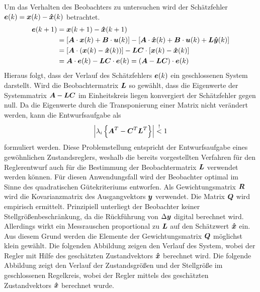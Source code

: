 Um das Verhalten des Beobachters zu untersuchen wird der Schätzfehler $\boldsymbol{e}(k) = \boldsymbol{x}(k) - \boldsymbol{\hat{x}}(k)$ betrachtet.
\begin{equation}
\begin{split}
\boldsymbol{e}(k+1) &= \boldsymbol{x}(k+1) - \boldsymbol{\hat{x}}(k+1) \\
&= [\boldsymbol{A}\cdot \boldsymbol{x}(k) + \boldsymbol{B}\cdot \boldsymbol{u}(k)] - [\boldsymbol{A}\cdot \boldsymbol{\hat{x}}(k) + \boldsymbol{B}\cdot \boldsymbol{u}(k) +\boldsymbol{L}\boldsymbol{\hat{y}}(k)]
\\
&= [\boldsymbol{A}\cdot (\boldsymbol{x}(k) - \boldsymbol{\hat{x}}(k))] - \boldsymbol{L}\boldsymbol{C}\cdot[\boldsymbol{x}(k)-\boldsymbol{\hat{x}}(k)] 
\\
&= \boldsymbol{A}\cdot \boldsymbol{e}(k) - \boldsymbol{LC}\cdot\boldsymbol{e}(k) = (\boldsymbol{A}-\boldsymbol{LC})\cdot \boldsymbol{e}(k)
\end{split}
\end{equation}
Hieraus folgt, dass der Verlauf des Schätzfehlers $\boldsymbol{e}(k)$ ein geschlossenen System darstellt. Wird die Beobachtermatrix $\boldsymbol{L}$ so gewählt, dass die Eigenwerte der Systemmatrix $\boldsymbol{A}-\boldsymbol{LC}$ im Einheitskreis liegen konvergiert der Schätzfehler gegen null. Da die Eigenwerte durch die Transponierung einer Matrix nicht verändert werden, kann die Entwurfsaufgabe als
\begin{equation}
\left\vert \lambda_i\left\{\boldsymbol{A}^T-\boldsymbol{C}^T\boldsymbol{L}^T\right\}\right\vert \overset{!}< 1
\end{equation}
formuliert werden. Diese Problemstellung entspricht der Entwurfsaufgabe eines gewöhnlichen Zustandsreglers, weshalb die bereits vorgestellten Verfahren für den Reglerentwurf auch für die Bestimmung der Beobachtermatrix $\boldsymbol{L}$ verwendet werden können. Für diesen Anwendungsfall wird der Beobachter optimal im Sinne des quadratischen Gütekriteriums entworfen. Als Gewichtungsmatrix $\boldsymbol{R}$ wird die Kovarianzmatrix des Ausgangvektors $\boldsymbol{y}$ verwendet. Die Matrix $\boldsymbol{Q}$ wird empirisch ermittelt. Prinzipiell unterliegt der Beobachter keiner Stellgrößenbeschränkung, da die Rückführung von $\Delta\boldsymbol{y}$ digital berechnet wird. Allerdings wirkt ein Messrauschen proportional zu $\boldsymbol{L}$ auf den Schätzwert $\boldsymbol{\hat{x}}$ ein. Aus diesem Grund werden die Elemente der Gewichtungsmatrix $\boldsymbol{Q}$ möglichst klein gewählt. Die folgenden Abbildung zeigen den Verlauf des System, wobei der Regler mit Hilfe des geschätzten Zustandvektors $\boldsymbol{\hat{x}}$ berechnet wird. Die folgende Abbildung zeigt den Verlauf der Zustandsgrößen und der Stellgröße im geschlossenen Regelkreis, wobei der Regler mittels des geschätzten Zustandvektors $\boldsymbol{\hat{x}}$ berechnet wurde.

